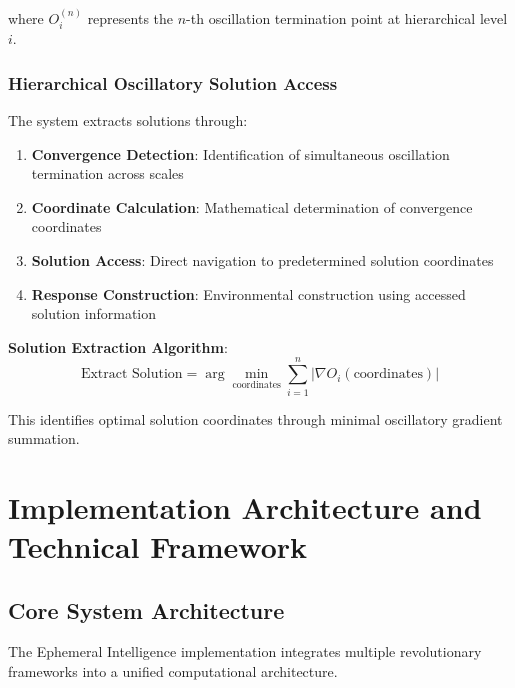 \documentclass[12pt,a4paper]{article}
\begin{document}
where $O_i^{(n)}$ represents the $n$-th oscillation termination point at hierarchical level $i$.

\subsubsection{Hierarchical Oscillatory Solution Access}

The system extracts solutions through:

\begin{enumerate}
\item \textbf{Convergence Detection}: Identification of simultaneous oscillation termination across scales
\item \textbf{Coordinate Calculation}: Mathematical determination of convergence coordinates
\item \textbf{Solution Access}: Direct navigation to predetermined solution coordinates
\item \textbf{Response Construction}: Environmental construction using accessed solution information
\end{enumerate}

\textbf{Solution Extraction Algorithm}:
\begin{equation}
\text{Extract Solution} = \arg\min_{\text{coordinates}} \sum_{i=1}^{n} |\nabla O_i(\text{coordinates})|
\end{equation}

This identifies optimal solution coordinates through minimal oscillatory gradient summation.

\section{Implementation Architecture and Technical Framework}

\subsection{Core System Architecture}

The Ephemeral Intelligence implementation integrates multiple revolutionary frameworks into a unified computational architecture.
\end{document}
